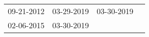 \begin{supertabular}{llll}
 09-21-2012 &  03-29-2019 &  03-30-2019 \\
 02-06-2015 &  03-30-2019 &             \\
\end{supertabular}

